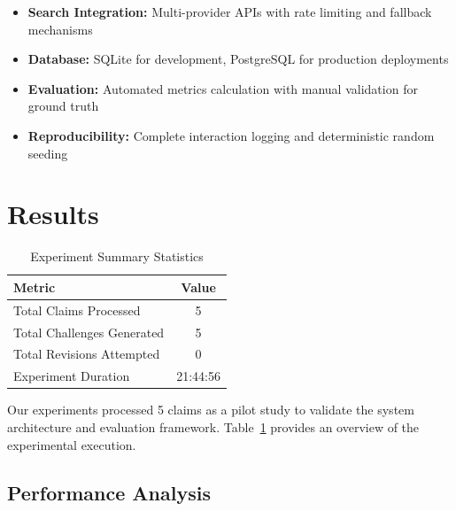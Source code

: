 \documentclass[11pt,a4paper]{article}
\begin{document}
\begin{itemize}
    \item \textbf{Search Integration:} Multi-provider APIs with rate limiting and fallback mechanisms
    \item \textbf{Database:} SQLite for development, PostgreSQL for production deployments
    \item \textbf{Evaluation:} Automated metrics calculation with manual validation for ground truth
    \item \textbf{Reproducibility:} Complete interaction logging and deterministic random seeding
\end{itemize}

\section{Results}

\begin{table}[htbp]
\centering
\caption{Experiment Summary Statistics}
\label{tab:experiment_summary}
\begin{tabular}{|l|c|}
\hline
\textbf{Metric} & \textbf{Value} \\
\hline
Total Claims Processed & 5 \\
Total Challenges Generated & 5 \\
Total Revisions Attempted & 0 \\
Experiment Duration & 21:44:56 \\
\hline
\end{tabular}
\end{table}

Our experiments processed 5 claims as a pilot study to validate the system architecture and evaluation framework. Table~\ref{tab:experiment_summary} provides an overview of the experimental execution.

\subsection{Performance Analysis}
\end{document}
